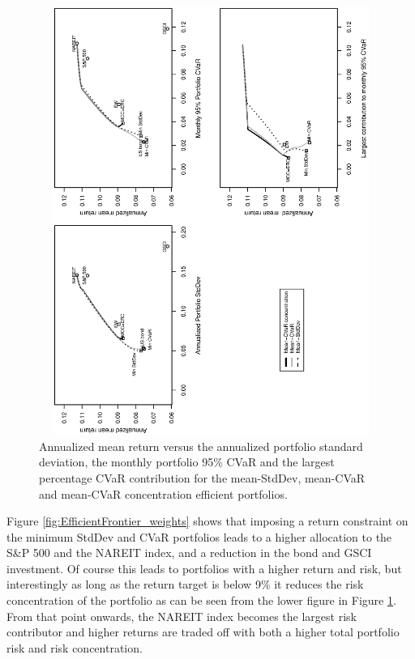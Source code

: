 \documentclass[12pt,a4paper]{article}
\begin{document}
\begin{figure}[t]
\caption{Annualized mean return versus the annualized portfolio standard deviation, the monthly portfolio 95\% CVaR and the largest percentage CVaR contribution for the mean-StdDev, mean-CVaR and mean-CVaR concentration efficient
portfolios.  \label{fig:EfficientFrontier}}
\includegraphics[width=16cm,height=14cm,angle=270]{frontier_fourassets_tris_clean.eps}
\end{figure}


Figure \ref{fig:EfficientFrontier_weights} shows that imposing a return constraint on the minimum StdDev and CVaR portfolios leads to a higher allocation to the S\&P 500 and the NAREIT index, and a reduction in the bond and GSCI investment. Of course this leads to portfolios with a higher return and risk, but interestingly as long as the return target is below 9\% it reduces the risk concentration of the portfolio as can be seen from the lower figure in Figure \ref{fig:EfficientFrontier}. From that point onwards, the NAREIT index becomes the largest risk contributor and higher returns are traded off with both a higher total portfolio risk and risk concentration.

\end{document}
